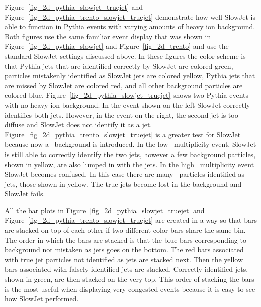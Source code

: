 \documentclass[11pt]{article}
\begin{document}
Figure~\ref{fig_2d_pythia_slowjet_truejet} and Figure~\ref{fig_2d_pythia_trento_slowjet_truejet} demonstrate how well SlowJet is able to function in Pythia events with varying amounts of heavy ion background. Both figures use the same familiar event display that was shown in Figure~\ref{fig_2d_pythia_slowjet} and Figure~\ref{fig_2d_trento} and use the standard SlowJet settings discussed above. In these figures the color scheme is that Pythia jets that are identified correctly by SlowJet are colored green, particles mistakenly identified as SlowJet jets are colored yellow,  Pythia jets that are missed by SlowJet are colored red, and all other background particles are colored blue. Figure~\ref{fig_2d_pythia_slowjet_truejet} shows two Pythia events with no heavy ion background. In the event shown on the left SlowJet correctly identifies both jets. However, in the event on the right, the second jet is too diffuse and SlowJet does not identify it as a jet. Figure~\ref{fig_2d_pythia_trento_slowjet_truejet} is a greater test for SlowJet because now a \trento\ background is introduced. In the low \trento\ multiplicity event, SlowJet is still able to correctly identify the two jets, however a few background particles, shown in yellow, are also lumped in with the jets.  In the high \trento\ multiplicity event SlowJet becomes confused. In this case there are many \trento\ particles identified as jets, those shown in yellow. The true jets become lost in the background and SlowJet fails.

All the bar plots in Figure~\ref{fig_2d_pythia_slowjet_truejet} and Figure~\ref{fig_2d_pythia_trento_slowjet_truejet} are created in a way so that bars are stacked on top of each other if two different color bars share the same bin. The order in which the bars are stacked is that the blue bars corresponding to background not mistaken as jets goes on the bottom. The red bars associated with true jet particles not identified as jets are stacked next. Then the yellow bars associated with falsely identified jets are stacked. Correctly identified jets, shown in green, are then stacked on the very top. This order of stacking the bars is the most useful when displaying very congested events because it is easy to see how SlowJet performed.
\end{document}
